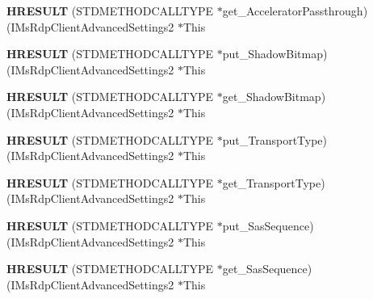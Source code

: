 \begin{DoxyCompactItemize}
{\bfseries H\+R\+E\+S\+U\+LT} (S\+T\+D\+M\+E\+T\+H\+O\+D\+C\+A\+L\+L\+T\+Y\+PE $\ast$get\+\_\+\+Accelerator\+Passthrough)(I\+Ms\+Rdp\+Client\+Advanced\+Settings2 $\ast$This
\item 
\mbox{\label{struct_i_ms_rdp_client_advanced_settings2_vtbl_a884a56caa78db7d8e5ed1396dffd1d27}} 
{\bfseries H\+R\+E\+S\+U\+LT} (S\+T\+D\+M\+E\+T\+H\+O\+D\+C\+A\+L\+L\+T\+Y\+PE $\ast$put\+\_\+\+Shadow\+Bitmap)(I\+Ms\+Rdp\+Client\+Advanced\+Settings2 $\ast$This
\item 
\mbox{\label{struct_i_ms_rdp_client_advanced_settings2_vtbl_ad264db2292599f5171d2c76e8dde7f16}} 
{\bfseries H\+R\+E\+S\+U\+LT} (S\+T\+D\+M\+E\+T\+H\+O\+D\+C\+A\+L\+L\+T\+Y\+PE $\ast$get\+\_\+\+Shadow\+Bitmap)(I\+Ms\+Rdp\+Client\+Advanced\+Settings2 $\ast$This
\item 
\mbox{\label{struct_i_ms_rdp_client_advanced_settings2_vtbl_ac1620f32441bbe3186ce357f9cfaaa85}} 
{\bfseries H\+R\+E\+S\+U\+LT} (S\+T\+D\+M\+E\+T\+H\+O\+D\+C\+A\+L\+L\+T\+Y\+PE $\ast$put\+\_\+\+Transport\+Type)(I\+Ms\+Rdp\+Client\+Advanced\+Settings2 $\ast$This
\item 
\mbox{\label{struct_i_ms_rdp_client_advanced_settings2_vtbl_ab4e53d7aadfb431a86bbcb06f8a7e305}} 
{\bfseries H\+R\+E\+S\+U\+LT} (S\+T\+D\+M\+E\+T\+H\+O\+D\+C\+A\+L\+L\+T\+Y\+PE $\ast$get\+\_\+\+Transport\+Type)(I\+Ms\+Rdp\+Client\+Advanced\+Settings2 $\ast$This
\item 
\mbox{\label{struct_i_ms_rdp_client_advanced_settings2_vtbl_a1fae224b8705919d1411721916fee3ee}} 
{\bfseries H\+R\+E\+S\+U\+LT} (S\+T\+D\+M\+E\+T\+H\+O\+D\+C\+A\+L\+L\+T\+Y\+PE $\ast$put\+\_\+\+Sas\+Sequence)(I\+Ms\+Rdp\+Client\+Advanced\+Settings2 $\ast$This
\item 
\mbox{\label{struct_i_ms_rdp_client_advanced_settings2_vtbl_a0d808fd04bf6f7fc9ea8433867c9bdf9}} 
{\bfseries H\+R\+E\+S\+U\+LT} (S\+T\+D\+M\+E\+T\+H\+O\+D\+C\+A\+L\+L\+T\+Y\+PE $\ast$get\+\_\+\+Sas\+Sequence)(I\+Ms\+Rdp\+Client\+Advanced\+Settings2 $\ast$This
\item 

\end{DoxyCompactItemize}
